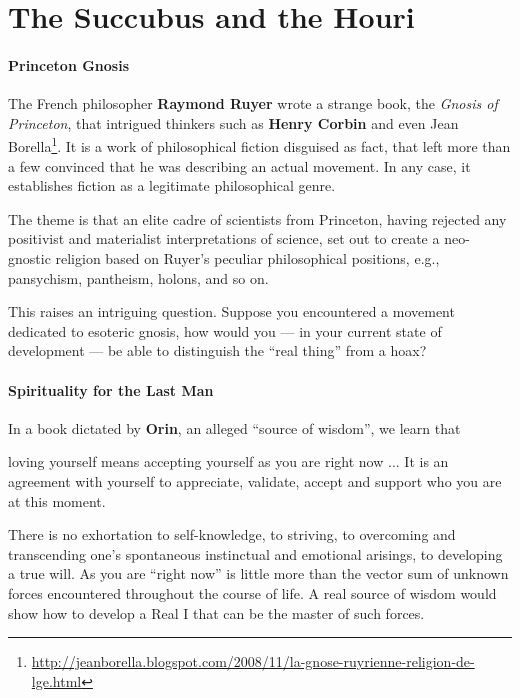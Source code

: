 \section{The Succubus and the Houri}

\paragraph{Princeton Gnosis}

The French philosopher \textbf{Raymond Ruyer} wrote a strange book, the \emph{Gnosis of Princeton}, that intrigued thinkers such as \textbf{Henry Corbin} and even Jean Borella\footnote{\url{http://jeanborella.blogspot.com/2008/11/la-gnose-ruyrienne-religion-de-lge.html}}. It is a work of philosophical fiction disguised as fact, that left more than a few convinced that he was describing an actual movement. In any case, it establishes fiction as a legitimate philosophical genre.

The theme is that an elite cadre of scientists from Princeton, having rejected any positivist and materialist interpretations of science, set out to create a neo-gnostic religion based on Ruyer's peculiar philosophical positions, e.g., pansychism, pantheism, holons, and so on.

This raises an intriguing question. Suppose you encountered a movement dedicated to esoteric gnosis, how would you --- in your current state of development --- be able to distinguish the ``real thing'' from a hoax?

\paragraph{Spirituality for the Last Man}


In a book dictated by \textbf{Orin}, an alleged ``source of wisdom'', we learn that 
\begin{quotex}
loving yourself means accepting yourself as you are right now ... It is an agreement with yourself to appreciate, validate, accept and support who you are at this moment.
\end{quotex}


There is no exhortation to self-knowledge, to striving, to overcoming and transcending one's spontaneous instinctual and emotional arisings, to developing a true will. As you are ``right now'' is little more than the vector sum of unknown forces encountered throughout the course of life. A real source of wisdom would show how to develop a Real I that can be the master of such forces.

